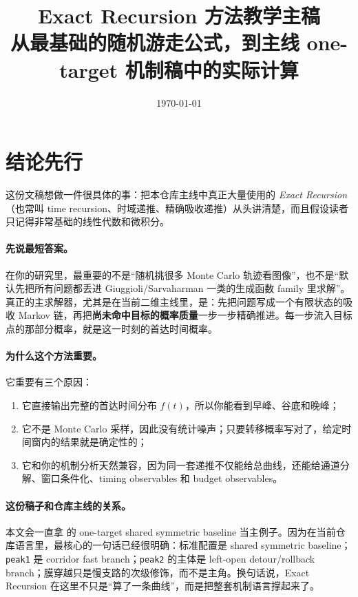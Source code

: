 \documentclass[11pt,fontset=fandol]{ctexart}
\title{Exact Recursion 方法教学主稿\\\large 从最基础的随机游走公式，到主线 one-target 机制稿中的实际计算}
\author{}
\date{\today}
\begin{document}
\maketitle

\section*{结论先行}
这份文稿想做一件很具体的事：把本仓库主线中真正大量使用的 \emph{Exact Recursion}（也常叫 time recursion、时域递推、精确吸收递推）从头讲清楚，而且假设读者只记得非常基础的线性代数和微积分。

\paragraph{先说最短答案。}
在你的研究里，最重要的不是“随机挑很多 Monte Carlo 轨迹看图像”，也不是“默认先把所有问题都丢进 Giuggioli/Sarvaharman 一类的生成函数 family 里求解”。真正的主求解器，尤其是在当前二维主线里，是：先把问题写成一个有限状态的吸收 Markov 链，再把\textbf{尚未命中目标的概率质量}一步一步精确推进。每一步流入目标点的那部分概率，就是这一时刻的首达时间概率。

\paragraph{为什么这个方法重要。}
它重要有三个原因：
\begin{enumerate}
  \item 它直接输出完整的首达时间分布 $f(t)$，所以你能看到早峰、谷底和晚峰；
  \item 它不是 Monte Carlo 采样，因此没有统计噪声；只要转移概率写对了，给定时间窗内的结果就是确定性的；
  \item 它和你的机制分析天然兼容，因为同一套递推不仅能给总曲线，还能给通道分解、窗口条件化、timing observables 和 budget observables。
\end{enumerate}

\paragraph{这份稿子和仓库主线的关系。}
本文会一直拿  的 one-target shared symmetric baseline 当主例子。因为在当前仓库语言里，最核心的一句话已经很明确：标准配置是 shared symmetric baseline；\texttt{peak1} 是 corridor fast branch；\texttt{peak2} 的主体是 left-open detour/rollback branch；膜穿越只是慢支路的次级修饰，而不是主角。换句话说，Exact Recursion 在这里不只是“算了一条曲线”，而是把整套机制语言撑起来了。
\end{document}
